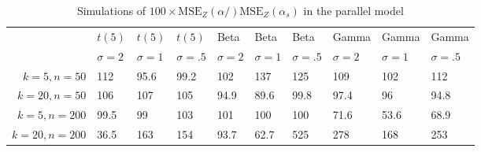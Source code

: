 \begin{table}[ht]
\centering
\caption{Simulations of $100 \times \textrm{MSE}_Z(\alpha/)\textrm{MSE}_Z(\alpha_s)$ in the parallel model} 
\label{tab:simulation}
\begin{tabular}{rlllllllll}
    \toprule
  & $t(5)$ & $t(5)$ & $t(5)$ & Beta & Beta & Beta & Gamma & Gamma & Gamma \\
  \cmidrule(lr){2-4}\cmidrule(lr){5-7}\cmidrule(lr){8-10} 
  & $\sigma = 2$ & $\sigma = 1$ & $\sigma = .5$ & $\sigma = 2$ & $\sigma = 1$ & $\sigma = .5$ & $\sigma = 2$ & $\sigma = 1$ & $\sigma = .5$ \\
$k = 5, n = 50$ & 112 & 95.6 & 99.2 & 102 & 137 & 125 & 109 & 102 & 112 \\ 
  $k = 20, n = 50$ & 106 & 107 & 105 & 94.9 & 89.6 & 99.8 & 97.4 & 96 & 94.8 \\ 
  $k = 5, n = 200$ & 99.5 & 99 & 103 & 101 & 100 & 100 & 71.6 & 53.6 & 68.9 \\ 
  $k = 20, n = 200$ & 36.5 & 163 & 154 & 93.7 & 62.7 & 525 & 278 & 168 & 253 \\ 
    \bottomrule
\end{tabular}
\end{table}
